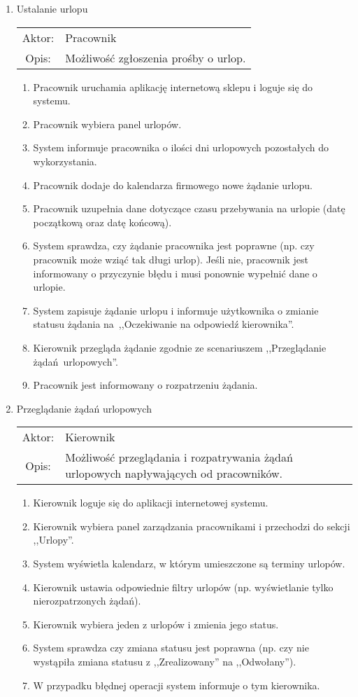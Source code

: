 \begin{enumerate}
  \item Ustalanie urlopu \\
  \begin{tabularx}{\linewidth}{ c X }
  Aktor: & Pracownik \\
  Opis: & Możliwość zgłoszenia prośby o urlop.\\
  \end{tabularx}
  \begin{enumerate}
    \item Pracownik uruchamia aplikację internetową sklepu i loguje się do systemu.
    \item Pracownik wybiera panel urlopów.
    \item System informuje pracownika o ilości dni urlopowych pozostałych do wykorzystania.
    \item Pracownik dodaje do kalendarza firmowego nowe żądanie urlopu.
    \item Pracownik uzupełnia dane dotyczące czasu przebywania na urlopie (datę początkową oraz datę końcową).
    \item System sprawdza, czy żądanie pracownika jest poprawne (np. czy pracownik może wziąć tak długi urlop).
    Jeśli nie, pracownik jest informowany o przyczynie błędu i musi ponownie wypełnić dane o urlopie.
    \item System zapisuje żądanie urlopu i informuje użytkownika o zmianie statusu żądania
    na~,,Oczekiwanie na odpowiedź kierownika''.
    \item Kierownik przegląda żądanie zgodnie ze scenariuszem ,,Przeglądanie żądań urlopowych''.
    \item Pracownik jest informowany o rozpatrzeniu żądania.
  \end{enumerate} 
  
  \item Przeglądanie żądań urlopowych \\
  \begin{tabularx}{\linewidth}{ c X }
  Aktor: & Kierownik \\
  Opis: & Możliwość przeglądania i rozpatrywania żądań urlopowych napływających od pracowników.\\
  \end{tabularx}
  \begin{enumerate}
    \item Kierownik loguje się do aplikacji internetowej systemu.
    \item Kierownik wybiera panel zarządzania pracownikami i przechodzi do sekcji ,,Urlopy''.
    \item System wyświetla kalendarz, w którym umieszczone są terminy urlopów.
    \item Kierownik ustawia odpowiednie filtry urlopów (np. wyświetlanie tylko nierozpatrzonych żądań).
    \item Kierownik wybiera jeden z urlopów i zmienia jego status.
    \item System sprawdza czy zmiana statusu jest poprawna (np. czy nie wystąpiła zmiana statusu z ,,Zrealizowany'' na ,,Odwołany'').
    \item W przypadku błędnej operacji system informuje o tym kierownika.
  \end{enumerate}

\end{enumerate}